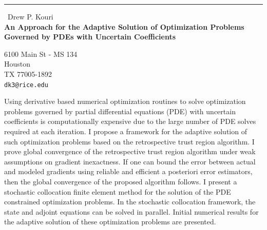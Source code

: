 \documentclass{report}
\begin{document}
\begin{center}
\rule{6in}{1pt} \
{\large Drew P. Kouri \\
{\bf An Approach for the Adaptive Solution of Optimization Problems Governed by PDEs with Uncertain Coefficients}}

6100 Main St - MS 134 \\ Houston \\ TX 77005-1892
\\
{\tt dk3@rice.edu}\end{center}

Using derivative based numerical optimization routines to solve
optimization problems governed by partial differential equations (PDE)
with uncertain coefficients is computationally expensive due to the large
number of PDE solves required at each iteration. I propose a framework
for the adaptive solution of such optimization problems based on the
retrospective trust region algorithm. I prove global convergence of the
retrospective trust region algorithm under weak assumptions on gradient
inexactness. If one can bound the error between actual and modeled
gradients using reliable and efficient a posteriori error estimators,
then the global convergence of the proposed algorithm follows. I present
a stochastic collocation finite element method for the solution of the
PDE constrained optimization problems. In the stochastic collocation
framework, the state and adjoint equations can be solved in parallel.
Initial numerical results for the adaptive solution of these optimization
problems are presented.
\end{document}
